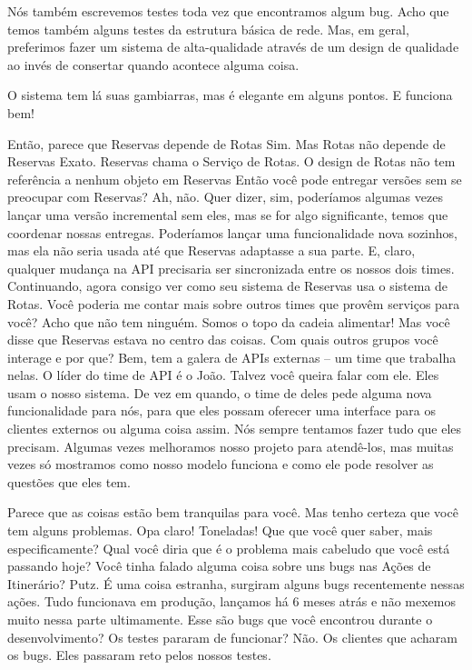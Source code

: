 \documentclass[12pt,play]{article}
\begin{document}
Nós também escrevemos testes toda vez que encontramos algum bug. Acho que temos também alguns testes da estrutura básica de rede. Mas, em geral, preferimos fazer um sistema de alta-qualidade através de um design de qualidade ao invés de consertar quando acontece alguma coisa.

O sistema tem lá suas gambiarras, mas é elegante em alguns pontos. E funciona bem!

\narr
{}

\scene
\dani Então, parece que Reservas depende de Rotas
\alexgui Sim.
\dani Mas Rotas não depende de Reservas
\gui Exato. Reservas chama o Serviço de Rotas. O design de Rotas não tem referência a nenhum objeto em Reservas
\dani Então você pode entregar versões sem se preocupar com Reservas?
\gui Ah, não. Quer dizer, sim, poderíamos algumas vezes lançar uma versão incremental sem eles, mas se for algo significante, temos que coordenar nossas entregas. Poderíamos lançar uma funcionalidade nova sozinhos, mas ela não seria usada até que Reservas adaptasse a sua parte.
\alex E, claro, qualquer mudança na API precisaria ser sincronizada entre os nossos dois times.
\dani Continuando, agora consigo ver como seu sistema de Reservas usa o sistema de Rotas. Você poderia me contar mais sobre outros times que provêm serviços para você?
\alex Acho que não tem ninguém. Somos o topo da cadeia alimentar!
\dani Mas você disse que Reservas estava no centro das coisas. Com quais outros grupos você interage e por que?
\alex Bem, tem a galera de APIs externas -- um time que trabalha nelas. O líder do time de API é o João. Talvez você queira falar com ele. Eles usam o nosso sistema. De vez em quando, o time de deles pede alguma nova funcionalidade para nós, para que eles possam oferecer uma interface para os clientes externos ou alguma coisa assim. Nós sempre tentamos fazer tudo que eles precisam. Algumas vezes melhoramos nosso projeto para atendê-los, mas muitas vezes só mostramos como nosso modelo funciona e como ele pode resolver as questões que eles tem.

\narr {}
\scene
\dani Parece que as coisas estão bem tranquilas para você. Mas tenho certeza que você tem alguns problemas.
\alex Opa claro! Toneladas! Que que você quer saber, mais especificamente?
\dani Qual você diria que é o problema mais cabeludo que você está passando hoje?
\gui Você tinha falado alguma coisa sobre uns bugs nas Ações de Itinerário?
\alex Putz. É uma coisa estranha, surgiram alguns bugs recentemente nessas ações. Tudo funcionava em produção, lançamos há 6 meses atrás e não mexemos muito nessa parte ultimamente.
\dani Esse são bugs que você encontrou durante o desenvolvimento? Os testes pararam de funcionar?
\alex {} Não. Os clientes que acharam os bugs. Eles passaram reto pelos nossos testes.
\end{document}

